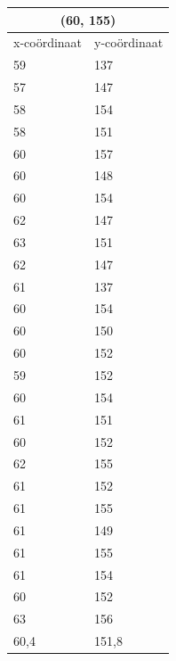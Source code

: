 \documentclass{article}
\begin{document}
\begin{tabular}{ |l|l| }
  \hline
  \multicolumn{2}{|c|}{(60, 155)} \\
  \hline
  x-co\"ordinaat & y-co\"ordinaat \\ \hline
     59 & 137\\ \hline
     57 & 147\\ \hline
     58 & 154\\ \hline
     58 & 151\\ \hline
     60 & 157\\ \hline
     60 & 148\\ \hline
     60 & 154\\ \hline
     62 & 147\\ \hline
     63 & 151\\ \hline
     62 & 147\\ \hline
     61 & 137\\ \hline
     60 & 154\\ \hline
     60 & 150\\ \hline
     60 & 152\\ \hline
     59 & 152\\ \hline
     60 & 154\\ \hline
     61 & 151\\ \hline
     60 & 152\\ \hline
     62 & 155\\ \hline
     61 & 152\\ \hline
     61 & 155\\ \hline
     61 & 149\\ \hline
     61 & 155\\ \hline
     61 & 154\\ \hline
     60 & 152\\ \hline
     63 & 156\\ \hline\hline
     60,4  & 151,8 \\ \hline
\end{tabular}
\end{document}
